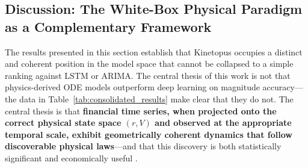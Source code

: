 \documentclass[11pt,a4paper]{article}
\begin{document}
\subsection{Discussion: The White-Box Physical Paradigm as a Complementary Framework}

The results presented in this section establish that Kinetopus occupies a distinct and coherent position in the model space that cannot be collapsed to a simple ranking against LSTM or ARIMA. The central thesis of this work is not that physics-derived ODE models outperform deep learning on magnitude accuracy---the data in Table~\ref{tab:consolidated_results} make clear that they do not. The central thesis is that \textbf{financial time series, when projected onto the correct physical state space $(r, V)$ and observed at the appropriate temporal scale, exhibit geometrically coherent dynamics that follow discoverable physical laws}---and that this discovery is both statistically significant and economically useful \cite{brunton2016discovering, raissi2019physics}.
\end{document}
